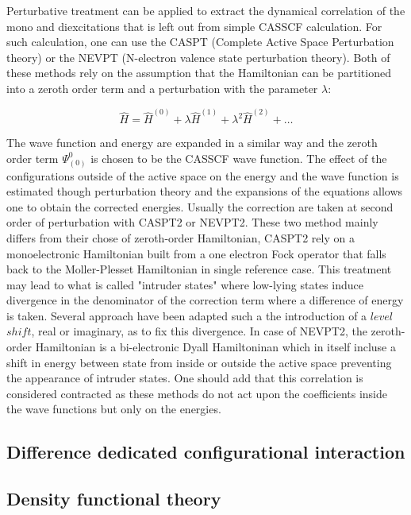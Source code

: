 \documentclass{article}
\begin{document}
Perturbative treatment can be applied to extract the dynamical correlation of the mono and diexcitations that is left out from simple CASSCF calculation. For such calculation, one can use the CASPT (Complete Active Space Perturbation theory)
or the NEVPT (N-electron valence state perturbation theory). Both of these methods rely on the assumption that the Hamiltonian can be partitioned into a zeroth order term and a perturbation with the parameter $\lambda$:

\begin{equation}
    \hat{H}=\hat{H}^{(0)}+\lambda\hat{H}^{(1)}+\lambda^2 \hat{H}^{(2)}+\ldots
\end{equation}


The wave function and energy are expanded in a similar way and the zeroth order term $\Psi_{(0)}^{0}$ is chosen to be the CASSCF wave function. 
The effect of the configurations outside of the active space on the energy and the wave function is estimated though perturbation theory and the expansions of the equations allows one to obtain the corrected energies.
Usually the correction are taken at second order of perturbation with CASPT2 or NEVPT2. These two method mainly differs from their chose of zeroth-order Hamiltonian, CASPT2 rely on a monoelectronic Hamiltonian built from a one electron Fock operator that falls back to the Moller-Plesset Hamiltonian in single reference case. 
This treatment may lead to what is called "intruder states" where low-lying states induce divergence in the denominator of the correction term where a difference of energy is taken. Several approach have been adapted such a the introduction of a $level$ $shift$, real or imaginary, as to fix this divergence.
In case of NEVPT2, the zeroth-order Hamiltonian is a bi-electronic Dyall Hamiltoninan which in itself incluse a shift in energy between state from inside or outside the active space preventing the appearance of intruder states.
One should add that this correlation is considered contracted as these
methods do not act upon the coefficients inside the wave functions but only on the
energies.

\subsection{Difference dedicated configurational interaction}



\subsection{Density functional theory}
\end{document}
